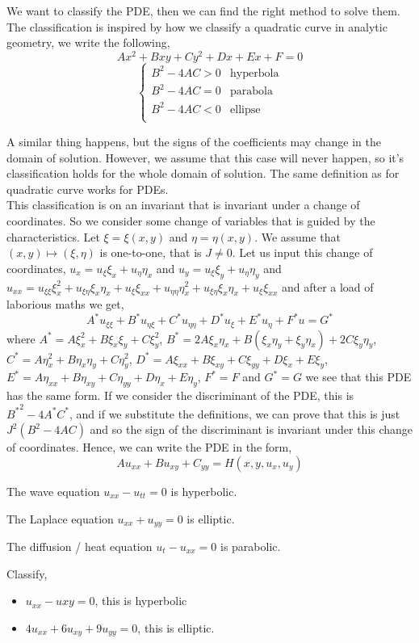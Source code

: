 We want to classify the PDE, then we can find the right method to solve them. The classification is inspired by how we classify a quadratic curve in analytic geometry, we write the following,
$$ Ax^2 + Bxy + Cy^2 + Dx + Ex + F = 0 $$
$$ \begin{cases}
  B^2 - 4AC > 0 & \text{hyperbola}\\
  B^2 - 4AC = 0 & \text{parabola} \\
  B^2 - 4AC < 0 & \text{ellipse} \\
\end{cases} $$

\noindent
A similar thing happens, but the signs of the coefficients may change in the domain of solution. However, we assume that this case will never happen, so it's classification holds for the whole domain of solution. The same definition as for quadratic curve works for PDEs. \\

\noindent
This classification is on an invariant that is invariant under a change of coordinates. So we consider some change of variables that is guided by the characteristics. Let $\xi = \xi(x, y)$ and $\eta = \eta(x, y)$. We assume that $(x, y) \mapsto (\xi, \eta)$ is one-to-one, that is $J \ne 0$. Let us input this change of coordinates, $u_x = u_\xi\xi_x + u_\eta\eta_x$ and $u_y = u_\xi\xi_y + u_\eta\eta_y$ and $u_{xx} = u_{\xi\xi}\xi_x^2 + u_{\xi\eta}\xi_x\eta_x + u_\xi\xi_{xx} + u_{\eta\eta}\eta_x^2  + u_{\xi\eta}\xi_x\eta_x + u_\xi\xi_{xx} $
and after a load of laborious maths we get,
$$ A^*u_{\xi\xi} + B^*u_{\eta\xi} + C^*u_{\eta\eta} + D^*u_\xi + E^*u_\eta + F^*u = G^* $$
where $A^* = A\xi_x^2 + B\xi_x\xi_y + C\xi_y^2$, $B^* = 2A\xi_x\eta_x + B(\xi_x\eta_y + \xi_y\eta_x) + 2C\xi_y\eta_y$, $C^* = A\eta_x^2 + B\eta_x\eta_y + C\eta_y^2$, $D^* = A\xi_{xx} + B\xi_{xy} + C\xi_{yy} + D\xi_x + E\xi_y$, $E^* = A\eta_{xx} + B\eta_{xy} + C\eta_{yy} + D\eta_x + E\eta_y$, $F^* = F$ and $G^* = G$
we see that this PDE has the same form. If we consider the discriminant of the PDE, this is ${B^*}^2 - 4A^*C^*$, and if we substitute the definitions, we can prove that this is just $J^2(B^2 - 4AC)$ and so the sign of the discriminant is invariant under this change of coordinates. Hence, we can write the PDE in the form,
$$ Au_{xx} + Bu_{xy} + C_{yy} = H(x, y, u_x, u_y) $$

\begin{eg}
  The wave equation $u_{xx} - u_{tt} = 0$ is hyperbolic.
\end{eg}
\begin{eg}
  The Laplace equation $u_{xx} + u_{yy} = 0$ is elliptic.
\end{eg}
\begin{eg}
  The diffusion / heat equation $u_{t} - u_{xx} = 0$ is parabolic.
\end{eg}
\begin{eg}
  Classify,
  \begin{itemize}
    \item $u_{xx} - u{xy} = 0$, this is hyperbolic
    \item $4u_{xx} + 6u_{xy} + 9u_{yy} = 0$, this is elliptic.
  \end{itemize}
\end{eg}

